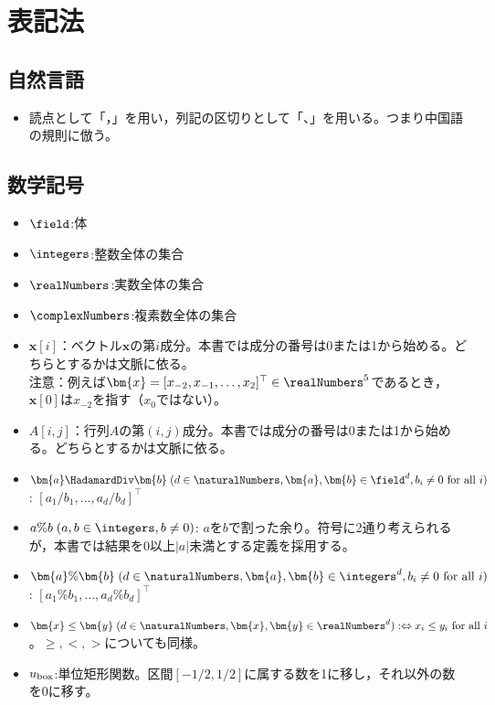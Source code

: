 \part{表記法}
    \chapter{自然言語}
    \begin{itemize}
        \item 読点として「，」を用い，列記の区切りとして「、」を用いる。つまり中国語の規則に倣う。
    \end{itemize}
    \chapter{数学記号}
        \begin{itemize}
            \item $\field$:体
            \item $\integers$:整数全体の集合
            \item $\realNumbers$:実数全体の集合
            \item $\complexNumbers$:複素数全体の集合
            \item $\bm{x}[i]$：ベクトル$\bm{x}$の第$i$成分。本書では成分の番号は0または1から始める。どちらとするかは文脈に依る。\\
            注意：例えば$\bm{x} = [x_{-2},x_{-1},\dots,x_2]^\top\in\realNumbers^5$であるとき，$\bm{x}[0]$は$x_{-2}$を指す（$x_0$ではない）。
            \item $A[i,j]$：行列$A$の第$(i,j)$成分。本書では成分の番号は0または1から始める。どちらとするかは文脈に依る。
            \item $\bm{a} \HadamardDiv \bm{b}\;(d \in \naturalNumbers,\bm{a},\bm{b} \in \field^d,b_i\neq 0 \text{ for all }i)$: $[a_1/b_1,\dots,a_d/b_d]^\top$
            \item $a\%b\;(a,b\in\integers,b\neq 0)$: $a$を$b$で割った余り。符号に2通り考えられるが，本書では結果を0以上$|a|$未満とする定義を採用する。
            \item $\bm{a}\%\bm{b}\;(d\in\naturalNumbers,\bm{a},\bm{b} \in \integers^d, b_i\neq 0 \text{ for all }i)$: $[a_1\%b_1,\dots,a_d\%b_d]^\top$
            \item $\bm{x} \leq \bm{y}\;(d\in\naturalNumbers,\bm{x},\bm{y} \in \realNumbers^d):\Leftrightarrow x_i \leq y_i \text{ for all }i$。$\geq, <, >$についても同様。
            \item $u_\mathrm{box}$:単位矩形関数。区間$[-1/2,1/2]$に属する数を1に移し，それ以外の数を0に移す。
        \end{itemize}

